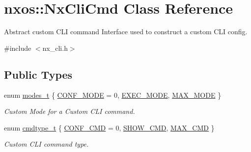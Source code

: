 \hypertarget{classnxos_1_1NxCliCmd}{
\section{nxos::NxCliCmd Class Reference}
\label{classnxos_1_1NxCliCmd}
}


Abstract custom CLI command Interface used to construct a custom CLI config.  


{\ttfamily \#include $<$nx\_\-cli.h$>$}\subsection*{Public Types}
\begin{DoxyCompactItemize}
\item 
enum \hyperlink{classnxos_1_1NxCliCmd_a72999b2e8f2995bbb19be346d875e3ce}{modes\_\-t} \{ \hyperlink{classnxos_1_1NxCliCmd_a72999b2e8f2995bbb19be346d875e3cea5f01458d92031d6ca875f201bd8d0bb1}{CONF\_\-MODE} =  0, 
\hyperlink{classnxos_1_1NxCliCmd_a72999b2e8f2995bbb19be346d875e3cea9213e9b4feb7ead0d2333bc83bfc5cdb}{EXEC\_\-MODE}, 
\hyperlink{classnxos_1_1NxCliCmd_a72999b2e8f2995bbb19be346d875e3ceaedb25d06f68762ba3a8c8bc831a14c6f}{MAX\_\-MODE}
 \}
\begin{DoxyCompactList}\small\item\em Custom Mode for a Custom CLI command. \item\end{DoxyCompactList}\item 
enum \hyperlink{classnxos_1_1NxCliCmd_a82ed104f13c7859b24d3c0527f706be1}{cmdtype\_\-t} \{ \hyperlink{classnxos_1_1NxCliCmd_a82ed104f13c7859b24d3c0527f706be1a95032ccdb393e24e4a57a330b3ba3142}{CONF\_\-CMD} =  0, 
\hyperlink{classnxos_1_1NxCliCmd_a82ed104f13c7859b24d3c0527f706be1a07e42d83caddae06870cbf324da56bbe}{SHOW\_\-CMD}, 
\hyperlink{classnxos_1_1NxCliCmd_a82ed104f13c7859b24d3c0527f706be1a09e26af6ee427940926af9bd7ef2e73d}{MAX\_\-CMD}
 \}
\begin{DoxyCompactList}\small\item\em Custom CLI command type. \item\end{DoxyCompactList}\end{DoxyCompactItemize}
